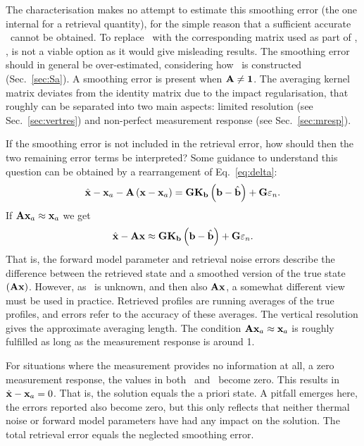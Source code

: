 The characterisation makes no attempt to estimate this smoothing error (the one
internal for a retrieval quantity), for the simple reason that a sufficient
accurate \aCvrMtr{\SttVct}\ cannot be obtained. To replace \aCvrMtr{\SttVct}\
with the corresponding matrix used as part of \OEM, , is not a
viable option as it would give misleading results. The smoothing error should
in general be over-estimated, considering how \aCvrMtr{\SttVct}\ is constructed
(Sec.~\ref{sec:Sa}). A smoothing error is present when $\mathbf{A}\neq\mathbf{1}$.
The averaging kernel matrix deviates from the identity matrix due to the
impact regularisation, that roughly can be separated into two main aspects:
limited resolution (see Sec.~\ref{sec:vertres}) and non-perfect measurement
response (see Sec.~\ref{sec:mresp}).

If the smoothing error is not included in the retrieval error, how should then
the two remaining error terms be interpreted? Some guidance to understand this
question can be obtained by a rearrangement of Eq.~\ref{eq:delta}:
\begin{equation}
  \hat{\mathbf{x}} -\mathbf{x}_{a} - \mathbf{A}\left( \mathbf{x}-\mathbf{x}_{a} \right) = 
    \mathbf{G}\mathbf{K}_{\mathbf{b}}\left(\mathbf{b}-\hat{\mathbf{b}}\right) +
    \mathbf{G}\varepsilon_n.
\end{equation}
If $\mathbf{A}\mathbf{x}_{a}\approx\mathbf{x}_{a}$ we get
\begin{equation}
  \hat{\mathbf{x}} - \mathbf{A}\mathbf{x} \approx 
    \mathbf{G}\mathbf{K}_{\mathbf{b}}\left(\mathbf{b}-\hat{\mathbf{b}}\right) +
    \mathbf{G}\varepsilon_n.
\end{equation}
That is, the forward model parameter and retrieval noise errors describe the
difference between the retrieved state and a smoothed version of the true state
$(\mathbf{A}\mathbf{x})$. However, as \SttVct\ is unknown, and then also
$\mathbf{A}\mathbf{x}$, a somewhat different view must be used in practice.
Retrieved profiles are running averages of the true profiles, and errors refer
to the accuracy of these averages. The vertical resolution gives the
approximate averaging length. The condition
$\mathbf{A}\mathbf{x}_{a}\approx\mathbf{x}_{a}$ is roughly fulfilled as long as the
measurement response is around 1.

For situations where the measurement provides no information at all, a zero
measurement response, the values in both \CtrFncMtr\ and \AvrKrnMtr\ become
zero. This results in $\hat{\mathbf{x}} - \mathbf{x}_{a} = 0$. That is, the solution equals
the a priori state. A pitfall emerges here, the errors reported also become
zero, but this only reflects that neither thermal noise or forward model
parameters have had any impact on the solution. The total retrieval error
equals the neglected smoothing error.



